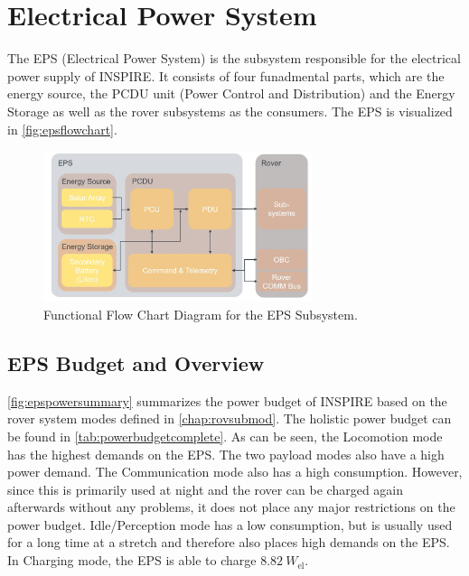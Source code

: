 \section{Electrical Power System}
\label{sec:EPS}
The EPS (Electrical Power System) is the subsystem responsible for the electrical power supply of INSPIRE. It consists of four funadmental parts, which are the energy source, the PCDU unit (Power Control and Distribution) and the Energy Storage as well as the rover subsystems as the consumers. The EPS is visualized in \autoref{fig:epsflowchart}.

\begin{figure}[htb]
{\centering
\includegraphics[width=0.7\textwidth]{Media/epsflowchart}
\caption{Functional Flow Chart Diagram for the EPS Subsystem.}
\label{fig:epsflowchart}
}
\end{figure}


\subsection{EPS Budget and Overview}
\autoref{fig:epspowersummary} summarizes the power budget of INSPIRE based on the rover system modes defined in \autoref{chap:rovsubmod}. The holistic power budget can be found in \autoref{tab:powerbudgetcomplete}.
As can be seen, the Locomotion mode has the highest demands on the EPS. The two payload modes also have a high power demand. The Communication mode also has a high consumption. However, since this is primarily used at night and the rover can be charged again afterwards without any problems, it does not place any major restrictions on the power budget. Idle/Perception mode has a low consumption, but is usually used for a long time at a stretch and therefore also places high demands on the EPS. In Charging mode, the EPS is able to charge $8.82 \ W_\text{el} $.


